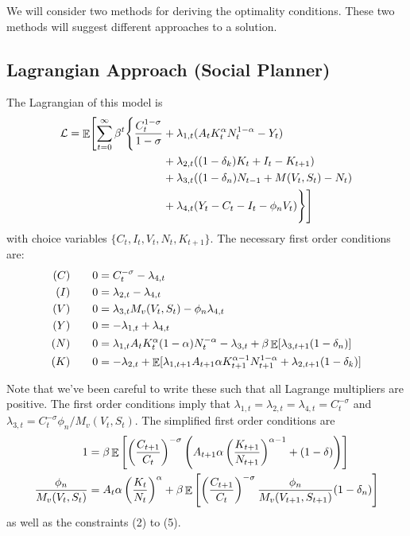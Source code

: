 \documentclass[10pt]{article}
\begin{document}
We will consider two methods for deriving the optimality conditions. These two methods will suggest different approaches to a solution.

\subsection{Lagrangian Approach (Social Planner)}

The Lagrangian of this model is
\begin{align*}
\mathcal{L} = \mathop{\mathbb{E}} \Biggl[ \sum_{t=0}^\infty \beta^t \Biggl\{\frac{C_t^{1-\sigma}}{1-\sigma} &+ \lambda_{1,t}(A_tK_t^\alpha N_t^{1-\alpha} - Y_t)  \\
&+ \lambda_{2,t}((1-\delta_k)K_t + I_t - K_{t+1}) \\
&+ \lambda_{3,t}((1-\delta_n)N_{t-1} + M(V_t,S_t) - N_t) \\
&+ \lambda_{4,t}(Y_t - C_t - I_t - \phi_nV_t) \Biggr\}\Biggr]
\end{align*}
with choice variables $\{C_t,I_t,V_t,N_t,K_{t+1}\}$. The necessary first order conditions are:
\begin{align*}
	(C) \qquad 0 &= C_t^{-\sigma} - \lambda_{4,t}\\
	(I) \qquad 0 &= \lambda_{2,t} - \lambda_{4,t} \\
	(V) \qquad 0 &= \lambda_{3,t} M_v(V_t,S_t) - \phi_n \lambda_{4,t}\\
	(Y) \qquad 0 &= -\lambda_{1,t} + \lambda_{4,t}\\
	(N) \qquad 0 &= \lambda_{1,t} A_t K_t^\alpha (1-\alpha)N_t^{-\alpha} - \lambda_{3,t} + \beta \mathop{\mathbb{E}} [\lambda_{3,t+1}(1 - \delta_n)]\\
	(K) \qquad 0 &= -\lambda_{2,t} + \mathop{\mathbb{E}}[\lambda_{1,t+1} A_{t+1} \alpha K_{t+1}^{\alpha - 1}N_{t+1}^{1-\alpha} + \lambda_{2,t+1}(1-\delta_k)]
\end{align*}

Note that we've been careful to write these such that all Lagrange multipliers are positive. The first order conditions imply that $\lambda_{1,t} = \lambda_{2,t} = \lambda_{4,t} = C_t^{-\sigma}$ and $\lambda_{3,t} = C_t^{-\sigma}\phi_n / M_v(V_t,S_t)$. The simplified first order conditions are
\begin{align}
	1 &= \beta \mathop{\mathbb{E}}\left[ \left( \frac{C_{t+1}}{C_t}\right)^{-\sigma}\left( A_{t+1} \alpha \left(\frac{K_{t+1}}{N_{t+1}}\right)^{\alpha - 1} + (1 - \delta)\right)\right] \\
	\frac{\phi_n}{M_v(V_t,S_t)} &= A_t\alpha \left(\frac{K_{t}}{N_{t}}\right)^{\alpha } + \beta \mathop{\mathbb{E}} \left[  \left( \frac{C_{t+1}}{C_t}\right)^{-\sigma} \frac{\phi_n}{M_v(V_{t+1},S_{t+1})}(1-\delta_n)\right]
\end{align}
as well as the constraints (2) to (5).
\end{document}
